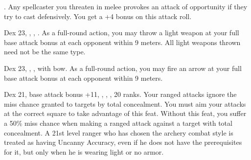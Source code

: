{.}
{Any spellcaster you threaten in melee provokes an attack of opportunity if they try to cast defensively. You get a +4 bonus on this attack roll.}

{Dex 23, , , .}
{As a full-round action, you may throw a light weapon at your full base attack bonus at each opponent within 9 meters. All light weapons thrown need not be the same type.}

{Dex 23, , ,  with bow.}
{As a full-round action, you may fire an arrow at your full base attack bonus at each opponent within 9 meters.}

{}
{Dex 21, base attack bonus +11, , , ,  20 ranks.}
{Your ranged attacks ignore the miss chance granted to targets by total concealment. You must aim your attacks at the correct square to take advantage of this feat.}
{Without this feat, you suffer a 50\% miss chance when making a ranged attack against a target with total concealment.}
{A 21st level ranger who has chosen the archery combat style is treated as having Uncanny Accuracy, even if he does not have the prerequisites for it, but only when he is wearing light or no armor.}
